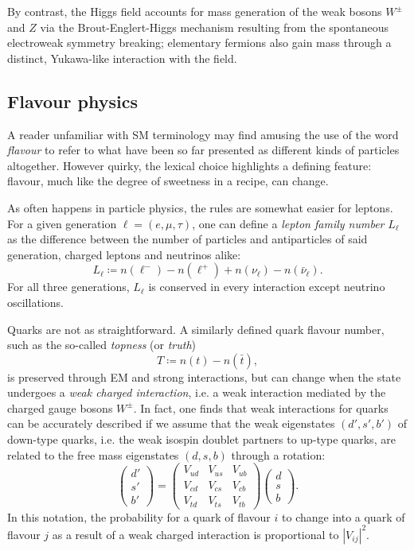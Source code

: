 By contrast, the Higgs field accounts for mass generation of the weak bosons $W^\pm$ and $Z$ via the Brout-Englert-Higgs mechanism resulting from the spontaneous electroweak symmetry breaking;
elementary fermions also gain mass through a distinct, Yukawa-like interaction with the field.

\subsection{Flavour physics} \label{sec:flavour-physics}
A reader unfamiliar with SM terminology may find amusing the use of the word \textit{flavour} to refer to what have been so far presented as different kinds of particles altogether.
However quirky, the lexical choice highlights a defining feature: flavour, much like the degree of sweetness in a recipe, can change.

As often happens in particle physics, the rules are somewhat easier for leptons. For a given generation $\ell = (e,\mu,\tau)$, one can define a \textit{lepton family number} $L_\ell$ as the difference between the number of particles and antiparticles of said generation, charged leptons and neutrinos alike:
\begin{equation}
L_\ell
\coloneqq
n(\ell^-) - n(\ell^+)
+
n(\nu_\ell) - n(\bar{\nu}_\ell).
\end{equation}
For all three generations, $L_\ell$ is conserved in every interaction except neutrino oscillations.

Quarks are not as straightforward.
A similarly defined quark flavour number, such as the so-called \textit{topness} (or \textit{truth})
\begin{equation}
T
\coloneqq
n(t) - n(\bar{t}),
\end{equation}
is preserved through EM and strong interactions, but can change when the state undergoes a \textit{weak charged interaction}, i.e. a weak interaction mediated by the charged gauge bosons $W^\pm$. In fact, one finds that weak interactions for quarks can be accurately described if we assume that the weak eigenstates $(d',s',b')$ of down-type quarks, i.e. the weak isospin doublet partners to up-type quarks, are related to the free mass eigenstates $(d,s,b)$ through a rotation:
\begin{equation}
	\begin{pmatrix}
		d' \\
		s' \\
		b'
	\end{pmatrix}
	=
	\begin{pmatrix}
		V_{ud} & V_{us} & V_{ub} \\
		V_{cd} & V_{cs} & V_{cb} \\
		V_{td} & V_{ts} & V_{tb}
	\end{pmatrix}
	\begin{pmatrix}
		d \\
		s \\
		b
	\end{pmatrix}.
	\label{eq:CKM_matrix}
\end{equation}
In this notation, the probability for a quark of flavour $i$ to change into a quark of flavour $j$ as a result of a weak charged interaction is proportional to ${\left| V_{ij} \right|}^2$.

